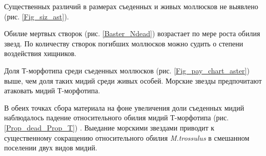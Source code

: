 \documentclass[20pt,a0,portrait]{a0poster}
\begin{document}
\begin{minipage}[t]{0.5\linewidth}
\begin{minipage}[t]{0.46\linewidth}
\begin{center}
			\label{Prop_dead_Prop_T}
		\end{center}
\end{minipage}\vspace{0.5cm}

\vspace{\belowdisplayskip}


Существенных различий в размерах съеденных и живых моллюсков не выявлено (рис. \ref{Fig_siz_ast}). 

Обилие мертвых створок (рис. \ref{Baster_Ndead}) возрастает по мере роста обилия звезд. По количеству створок погибших моллюсков можно судить о степени воздействия хищников.  

Доля Т-морфотипа среди съеденных моллюсков (рис.  \ref{Fig_pay_chart_aster}) выше, чем доля таких мидий среди живых особей. Морские звезды предпочитают атаковать мидий Т-морфотипа. 

В обеих точках сбора материала на фоне увеличения доли съеденных мидий наблюдалось падение относительного обилия мидий Т-морфотипа (рис. \ref{Prop_dead_Prop_T}) . Выедание морскими звездами приводит к существенному сокращению относительного обилия \emph{M.trossulus} в смешанном поселении двух видов мидий.

\end{minipage}\hspace{1cm}
%
\end{document}
